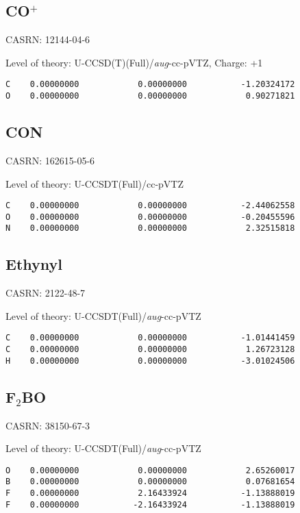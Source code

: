 \documentclass[journal=jctcce,manuscript=article,layout=traditional]{achemso}
\newcommand{\TZ}{cc-pVTZ}
\newcommand{\AVTZ}{\emph{aug}-cc-pVTZ}
\begin{document}
\subsection{CO$^+$}

CASRN: 12144-04-6

\begin{singlespace}
\noindent Level of theory: U-CCSD(T)(Full)/{\AVTZ}, Charge: +1
\begin{verbatim}
C    0.00000000            0.00000000           -1.20324172
O    0.00000000            0.00000000            0.90271821
\end{verbatim}
\end{singlespace}

 
\subsection{CON}

CASRN: 162615-05-6

\begin{singlespace}
\noindent Level of theory: U-CCSDT(Full)/{\TZ}
\begin{verbatim}
C    0.00000000            0.00000000           -2.44062558
O    0.00000000            0.00000000           -0.20455596
N    0.00000000            0.00000000            2.32515818
\end{verbatim}
\end{singlespace}

\subsection{Ethynyl}

CASRN: 2122-48-7

\begin{singlespace}
\noindent Level of theory: U-CCSDT(Full)/{\AVTZ}
\begin{verbatim}
C    0.00000000            0.00000000           -1.01441459
C    0.00000000            0.00000000            1.26723128
H    0.00000000            0.00000000           -3.01024506
\end{verbatim}
\end{singlespace}

\subsection{F$_2$BO}

CASRN: 38150-67-3

\begin{singlespace}
\noindent Level of theory: U-CCSDT(Full)/{\AVTZ}
\begin{verbatim}
O    0.00000000            0.00000000            2.65260017
B    0.00000000            0.00000000            0.07681654
F    0.00000000            2.16433924           -1.13888019
F    0.00000000           -2.16433924           -1.13888019
 \end{verbatim}
\end{singlespace}
\end{document}
